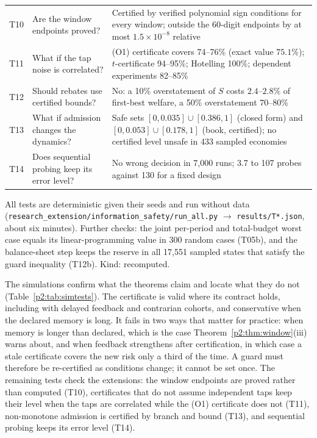 \begin{table}[!tbp]
\begin{threeparttable}
\begin{tabular}{p{}p{}p{}}
T10 & Are the window endpoints proved? & Certified by verified polynomial sign conditions for every window; outside the 60-digit endpoints by at most $1.5\times10^{-8}$ relative\\
T11 & What if the tap noise is correlated? & (O1) certificate covers 74--76\% (exact value $75.1\%$); $t$-certificate 94--95\%; Hotelling 100\%; dependent experiments 82--85\%\\
T12 & Should rebates use certified bounds? & No: a 10\% overstatement of $S$ costs $2.4$--$2.8\%$ of first-best welfare, a 50\% overstatement $70$--$80\%$\\
T13 & What if admission changes the dynamics? & Safe sets $[0,0.035]\cup[0.386,1]$ (closed form) and $[0,0.053]\cup[0.178,1]$ (book, certified); no certified level unsafe in 433 sampled economies\\
T14 & Does sequential probing keep its error level? & No wrong decision in 7{,}000 runs; 3.7 to 107 probes against 130 for a fixed design\\
\bottomrule
\end{tabular}
\begin{tablenotes}\footnotesize\item All tests are deterministic given their seeds and run without data (\texttt{research\_extension/information\_safety/run\_all.py} $\to$ \texttt{results/T*.json}, about six minutes). Further checks: the joint per-period and total-budget worst case equals its linear-programming value in 300 random cases (T05b), and the balance-sheet step keeps the reserve in all 17{,}551 sampled states that satisfy the guard inequality (T12b). Kind: recomputed. \end{tablenotes}
\end{threeparttable}
\end{table}

The simulations confirm what the theorems claim and locate what they do not (Table~\ref{p2:tab:simtests}). The certificate is valid where its contract holds, including with delayed feedback and contrarian cohorts, and conservative when the declared memory is long. It fails in two ways that matter for practice: when memory is longer than declared, which is the case Theorem~\ref{p2:thm:window}(iii) warns about, and when feedback strengthens after certification, in which case a stale certificate covers the new risk only a third of the time. A guard must therefore be re-certified as conditions change; it cannot be set once. The remaining tests check the extensions: the window endpoints are proved rather than computed (T10), certificates that do not assume independent taps keep their level when the taps are correlated while the (O1) certificate does not (T11), non-monotone admission is certified by branch and bound (T13), and sequential probing keeps its error level (T14).

